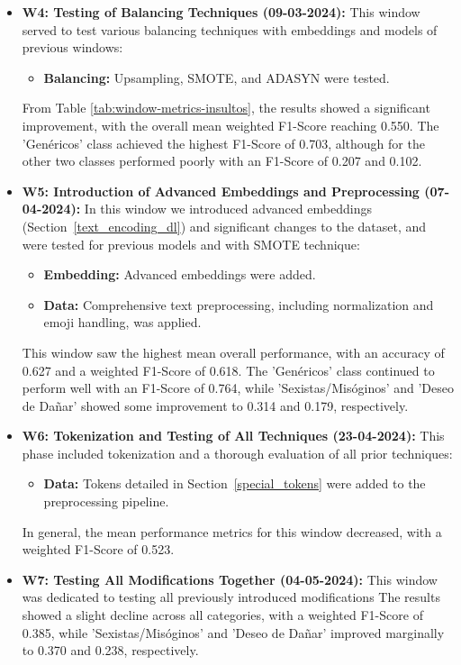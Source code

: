 \begin{itemize}
    \item \textbf{W4: Testing of Balancing Techniques (09-03-2024):} This window served to test various balancing techniques with embeddings and models of previous windows:
        \begin{itemize}
            \item \textbf{Balancing:} Upsampling, SMOTE, and ADASYN were tested.
        \end{itemize}
    From Table \ref{tab:window-metrics-insultos}, the results showed a significant improvement, with the overall mean weighted F1-Score reaching 0.550. The 'Genéricos' class achieved the highest F1-Score of 0.703, although for the other two classes performed poorly with an F1-Score of 0.207 and 0.102.
    
    \item \textbf{W5: Introduction of Advanced Embeddings and Preprocessing (07-04-2024):} In this window we introduced advanced embeddings (Section~\ref{text_encoding_dl}) and significant changes to the dataset, and were tested for previous models and with SMOTE technique:
        \begin{itemize}
            \item \textbf{Embedding:} Advanced embeddings were added.
            \item \textbf{Data:} Comprehensive text preprocessing, including normalization and emoji handling, was applied.
        \end{itemize}
    This window saw the highest mean overall performance, with an accuracy of 0.627 and a weighted F1-Score of 0.618. The 'Genéricos' class continued to perform well with an F1-Score of 0.764, while 'Sexistas/Misóginos' and 'Deseo de Dañar' showed some improvement to 0.314 and 0.179, respectively.

    \item \textbf{W6: Tokenization and Testing of All Techniques (23-04-2024):} This phase included tokenization and a thorough evaluation of all prior techniques:
        \begin{itemize}
            \item \textbf{Data:} Tokens detailed in Section~\ref{special_tokens} were added to the preprocessing pipeline.
        \end{itemize}
    In general, the mean performance metrics for this window decreased, with a weighted F1-Score of 0.523.

    \item \textbf{W7: Testing All Modifications Together (04-05-2024):} This window was dedicated to testing all previously introduced modifications
    The results showed a slight decline across all categories, with a weighted F1-Score of 0.385, while 'Sexistas/Misóginos' and 'Deseo de Dañar' improved marginally to 0.370 and 0.238, respectively.


\end{itemize}
